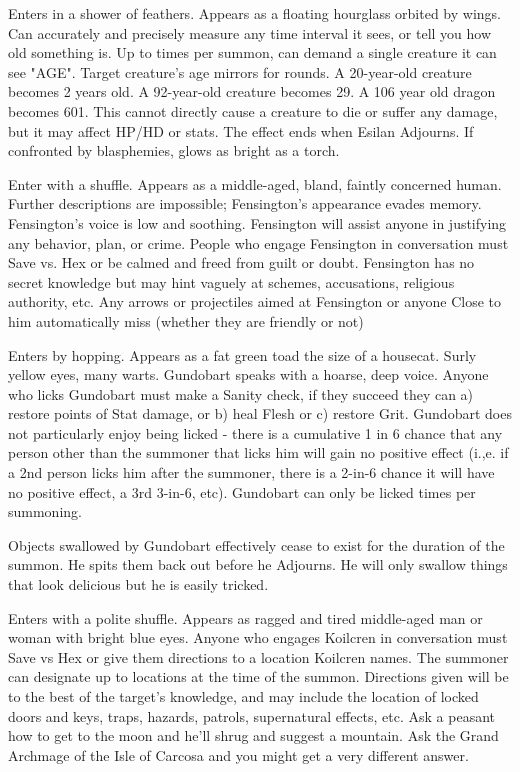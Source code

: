 {
Enters in a shower of feathers. Appears as a floating hourglass orbited by wings. Can accurately and precisely measure any time interval it sees, or tell you how old something is.  Up to \DICE times per summon, can demand a single creature it can see "AGE". Target creature's age mirrors for \SUMDICE rounds. A 20-year-old creature becomes 2 years old. A 92-year-old creature becomes 29. A 106 year old dragon becomes 601. This cannot directly cause a creature to die or suffer any damage, but it may affect HP/HD or stats.  The effect ends when Esilan Adjourns. If confronted by blasphemies, glows as bright as a torch.



Enter with a shuffle. Appears as a middle-aged, bland, faintly concerned human. Further descriptions are impossible; Fensington's appearance evades memory. Fensington's voice is low and soothing. Fensington will assist anyone in justifying any behavior, plan, or crime. People who engage Fensington in conversation must Save vs. Hex or be calmed and freed from guilt or doubt. Fensington has no secret knowledge but may hint vaguely at schemes, accusations, religious authority, etc. Any arrows or projectiles aimed at Fensington or anyone Close to him automatically miss (whether they are friendly or not)


Enters by hopping. Appears as a fat green toad the size of a housecat. Surly yellow eyes, many warts. Gundobart speaks with a hoarse, deep voice. Anyone who licks Gundobart must make a Sanity check, if they succeed they can a) restore \DICE points of Stat damage, or b) heal \DICE Flesh  or c) restore \SUMDICE Grit.  Gundobart does not particularly enjoy being licked - there is a cumulative 1 in 6 chance that any person other than the summoner that licks him will gain no positive effect (i.,e.  if a 2nd person licks him after the summoner, there is a 2-in-6 chance it will have no positive effect, a 3rd 3-in-6, etc).  Gundobart can only be licked \DICE times per summoning.

Objects swallowed by Gundobart effectively cease to exist for the duration of the summon. He spits them back out before he Adjourns. He will only swallow things that look delicious but he is easily tricked.

Enters with a polite shuffle. Appears as ragged and tired middle-aged man or woman with bright blue eyes. Anyone who engages Koilcren in conversation must Save vs Hex or give them directions to a location Koilcren names. The summoner can designate up to \DICE locations at the time of the summon. Directions given will be to the best of the target's knowledge, and may include the location of locked doors and keys, traps, hazards, patrols, supernatural effects, etc. Ask a peasant how to get to the moon and he'll shrug and suggest a mountain. Ask the Grand Archmage of the Isle of Carcosa and you might get a very different answer.  



}
